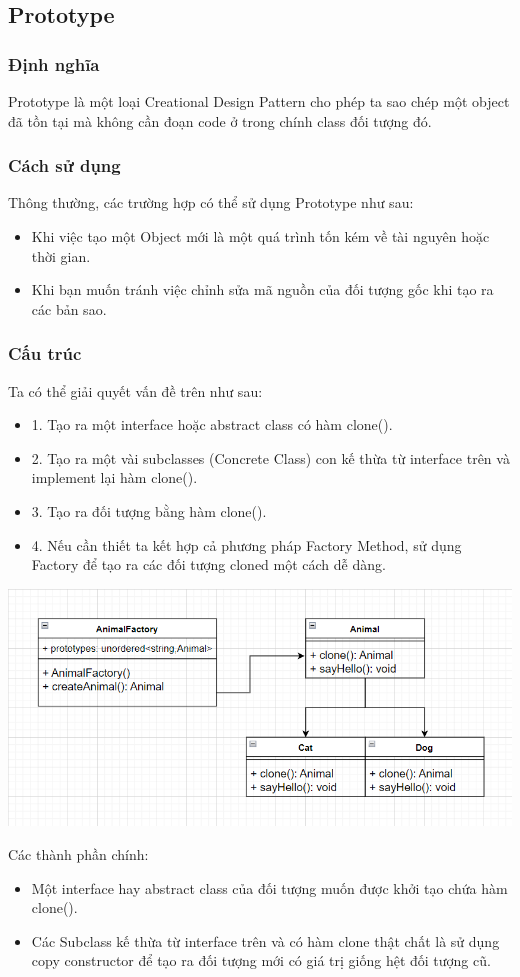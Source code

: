 \subsection{Prototype}
\subsubsection{Định nghĩa}
Prototype là một loại Creational Design Pattern cho phép ta sao chép một object đã tồn tại mà không cần đoạn code ở trong chính class đối tượng đó.
\subsubsection{Cách sử dụng}
Thông thường, các trường hợp có thể sử dụng Prototype như sau:
\begin{itemize}
    \item Khi việc tạo một Object mới là một quá trình tốn kém về tài nguyên hoặc thời gian.
    \item Khi bạn muốn tránh việc chỉnh sửa mã nguồn của đối tượng gốc khi tạo ra các bản sao.
\end{itemize}
\subsubsection{Cấu trúc}
Ta có thể giải quyết vấn đề trên như sau:
\begin{itemize}
    \item 1. Tạo ra một interface hoặc abstract class có hàm clone().
    \item 2. Tạo ra một vài subclasses (Concrete Class) con kế thừa từ interface trên và implement lại hàm clone().
    \item 3. Tạo ra đối tượng bằng hàm clone().
    \item 4. Nếu cần thiết ta kết hợp cả phương pháp Factory Method, sử dụng Factory để tạo ra các đối tượng cloned một cách dễ dàng.
\end{itemize}
\begin{center}
    \includegraphics[scale=0.9]{image/creational/pso.png}
\end{center}
Các thành phần chính:
\begin{itemize}
    \item Một interface hay abstract class của đối tượng muốn được khởi tạo chứa hàm clone().
    \item Các Subclass kế thừa từ interface trên và có hàm clone thật chất là sử dụng copy constructor để tạo ra đối tượng mới có giá trị giống hệt đối tượng cũ.
\end{itemize}
